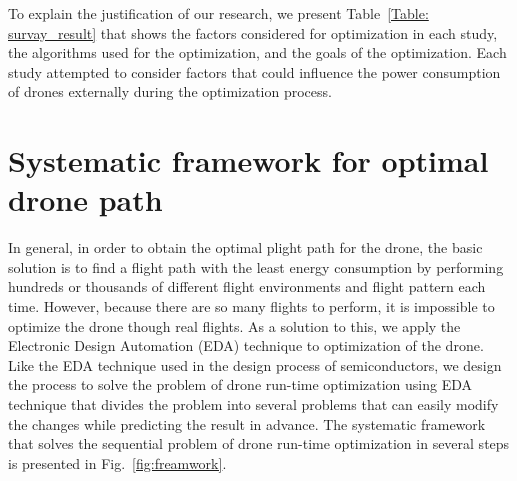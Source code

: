 \documentclass[journal]{./template/IEEEtran}
\begin{document}
To explain the justification of our research, we present Table~\ref{Table: survay_result} that shows the factors considered for optimization in each study, the algorithms used for the optimization, and the goals of the optimization.
Each study attempted to consider factors that could influence the power consumption of drones externally during the optimization process. 


\label{Section: Related works}











\section {Systematic framework for optimal drone path}

In general, in order to obtain the optimal plight path for the drone, the basic solution is to find a flight path with the least energy consumption by performing hundreds or thousands of different flight environments and flight pattern each time.
However, because there are so many flights to perform, it is impossible to optimize the drone though real flights.
As a solution to this, we apply the Electronic Design Automation (EDA) technique to optimization of the drone.
Like the EDA technique used in the design process of semiconductors, we design the process to solve the problem of drone run-time optimization using EDA technique that  divides the problem into several problems that can easily modify the changes while predicting the result in advance. 
The systematic framework that solves the sequential problem of drone run-time optimization in several steps is presented in Fig.~\ref{fig:freamwork}.
\end{document}
